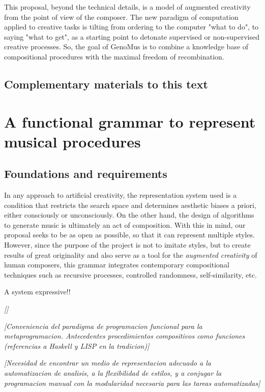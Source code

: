 \documentclass{article}
\begin{document}
This proposal, beyond the technical details, is a model of augmented creativity from the point of view of the composer. The new paradigm of computation applied to creative tasks is tilting from ordering to the computer "what to do", to saying "what to get", as a starting point to detonate supervised or non-supervised creative processes. So, the goal of GenoMus is to combine a knowledge base of compositional procedures with the maximal freedom of recombination. 

\subsection{Complementary materials to this text}





\section{A functional grammar to represent musical procedures}

\subsection{Foundations and requirements}

In any approach to artificial creativity, the representation system used is a condition that restricts the search space and determines aesthetic biases a priori, either consciously or unconsciously. On the other hand, the design of algorithms to generate music is ultimately an act of composition. With this in mind, our proposal seeks to be as open as possible, so that it can represent multiple styles. However, since the purpose of the project is not to imitate styles, but to create results of great originality and also serve as a tool for the \emph{augmented creativity} of human composers, this grammar integrates contemporary compositional techniques such as recursive processes, controlled randomness, self-similarity, etc.

A system expressive!!

{\color{gray} \textsl{[]}}

{\color{gray} \textsl{[Conveniencia del paradigma de programacion funcional para la metaprogramacion. Antecedentes procedimientos compositivos como funciones (referencias a Haskell y LISP en la tradicion)]}}

{\color{gray} \textsl{[Necesidad de encontrar un medio de representacion adecuado a la automatizacion de analisis, a la flexibilidad de estilos, y a conjugar la programacion manual con la modularidad necesaria para las tareas automatizadas]}}
\end{document}
